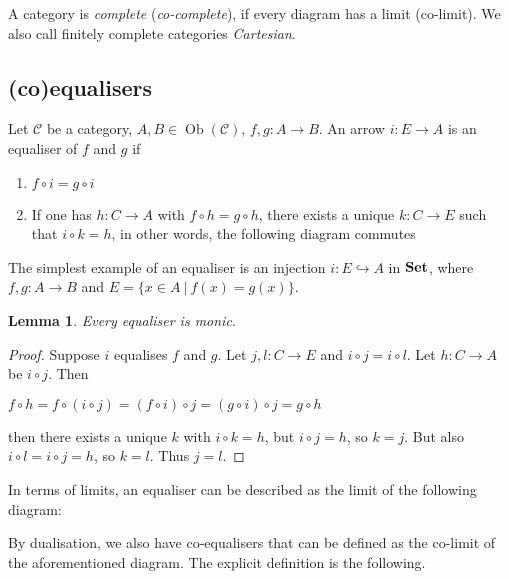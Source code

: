 \documentclass[a4paper]{article}
\theoremstyle{defin}
\theoremstyle{theorem}
\theoremstyle{claim}
\theoremstyle{prop}
\theoremstyle{lemma}
\newtheorem{lemma}{Lemma}
\theoremstyle{fact}
\theoremstyle{ex}
\theoremstyle{col}
\begin{document}
A category is \emph{complete} (\emph{co-complete}), if every diagram has a limit (co-limit). We also call finitely complete categories \emph{Cartesian}.

\subsection{(co)equalisers}

Let $\mathcal{C}$ be a category, $A, B \in \operatorname{Ob}(\mathcal{C})$, $f, g : A \to B$. An arrow $i : E \to A$ is an equaliser of $f$ and $g$ if
\begin{enumerate}
\item $f \circ i = g \circ i$
\item If one has $h : C \to A$ with $f \circ h = g \circ h$, there exists a unique $k : C \to E$ such that $i \circ k = h$, in other words, the following diagram commutes

\centerline{
}
\end{enumerate}

The simplest example of an equaliser is an injection $i : E \hookrightarrow A$ in ${\bf Set}$,
where $f, g : A \to B$ and $E = \{ x \in A \: | \: f(x) = g(x) \}$.

\begin{lemma}
Every equaliser is monic.
\end{lemma}

\begin{proof}
Suppose $i$ equalises $f$ and $g$. Let $j, l : C \to E$ and $i \circ j = i \circ l$. Let $h : C \to A$ be $i \circ j$. Then

\begin{center}
$f \circ h = f \circ (i \circ j) = (f \circ i) \circ j = (g \circ i) \circ j = g \circ h$
\end{center}

then there exists a unique $k$ with $i \circ k = h$, but $i \circ j = h$, so $k = j$. But also $i \circ l = i \circ j = h$, so $k = l$. Thus $j = l$.
\end{proof}

In terms of limits, an equaliser can be described as the limit of the following diagram:
\centerline{
}

By dualisation, we also have co-equalisers that can be defined as the co-limit of the aforementioned diagram. The explicit definition is the following.
\end{document}
